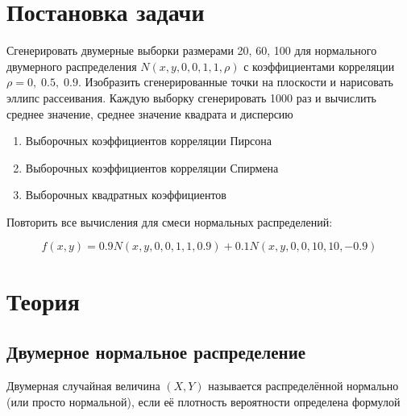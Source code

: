\documentclass[12pt]{article}
\begin{document}
\begin{flushleft}

\setlength{\parindent}{1cm}

\tableofcontents

\newpage

\listoffigures

\newpage

\listoftables

\newpage

\section{Постановка задачи}

    Сгенерировать двумерные выборки размерами 20, 60, 100 для нормального двумерного распределения $N(x, y, 0, 0, 1, 1, \rho)$ с коэффициентами корреляции $\rho = 0, \; 0.5, \; 0.9$. Изобразить сгенерированные точки на плоскости и нарисовать эллипс рассеивания. Каждую выборку сгенерировать 1000 раз и вычислить среднее значение, среднее значение квадрата и дисперсию

    \begin{enumerate}
        \item Выборочных коэффициентов корреляции Пирсона
        \item Выборочных коэффициентов корреляции Спирмена
        \item Выборочных квадратных коэффициентов
    \end{enumerate}

    Повторить все вычисления для смеси нормальных распределений:

    \begin{equation}
        f(x,y) = 0.9N(x, y, 0, 0, 1, 1, 0.9) + 0.1N(x, y, 0, 0, 10, 10, -0.9)
        \label{normal_mix}
    \end{equation}

\newpage

\section{Теория}

    \subsection{Двумерное нормальное распределение}

    Двумерная случайная величина $(X, Y)$ называется распределённой нормально (или просто нормальной), если её плотность вероятности определена формулой


\end{flushleft}
\end{document}
